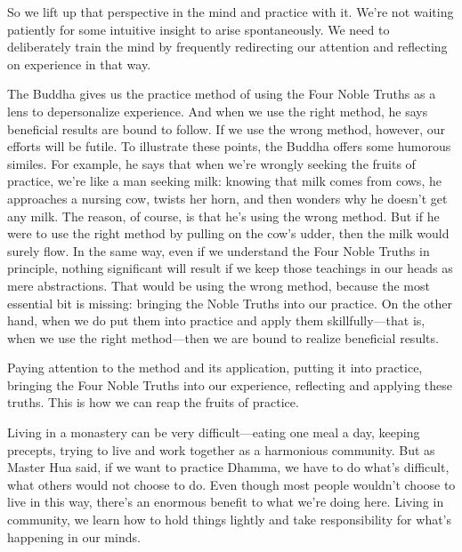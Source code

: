 So we lift up that perspective in the mind and practice with it. We're 
not waiting patiently for some intuitive insight to arise 
spontaneously. We need to deliberately train the mind by frequently 
redirecting our attention and reflecting on experience in that way.

The Buddha gives us the practice method of using the Four Noble Truths 
as a lens to depersonalize experience. And when we use the right 
method, he says beneficial results are bound to follow. If we use the 
wrong method, however, our efforts will be futile. To illustrate these 
points, the Buddha offers some humorous similes. For example, he says 
that when we're wrongly seeking the fruits of practice, we're like a 
man seeking milk: knowing that milk comes from cows, he approaches a 
nursing cow, twists her horn, and then wonders why he doesn't get any 
milk. The reason, of course, is that he's using the wrong method. But 
if he were to use the right method by pulling on the cow's udder, then 
the milk would surely flow. In the same way, even if we understand the 
Four Noble Truths in principle, nothing significant will result if we 
keep those teachings in our heads as mere abstractions. That would be 
using the wrong method, because the most essential bit is missing: 
bringing the Noble Truths into our practice. On the other hand, when we 
do put them into practice and apply them skillfully---that is, when we 
use the right method---then we are bound to realize beneficial results.

Paying attention to the method and its application, putting it into 
practice, bringing the Four Noble Truths into our experience, 
reflecting and applying these truths. This is how we can reap the 
fruits of practice.


Living in a monastery can be very difficult---eating one meal a day, 
keeping precepts, trying to live and work together as a harmonious 
community. But as Master Hua said, if we want to practice Dhamma, we 
have to do what's difficult, what others would not choose to do. Even 
though most people wouldn't choose to live in this way, there's an 
enormous benefit to what we're doing here. Living in community, we 
learn how to hold things lightly and take responsibility for what's 
happening in our minds.

